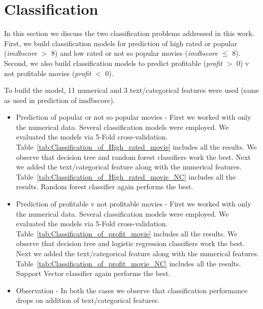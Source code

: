 \documentclass{article}%
\begin{document}
\section{Classification}

In this section we discuss the two classification problems addressed in this work. First, we build classification models for prediction of high rated or popular (\textit{imdbscore} $>$ 8) and low rated or not so popular movies (\textit{imdbscore} $\leq$ 8). Second, we also build classification models to predict profitable (\textit{profit} $>$ 0) v not profitable movies (\textit{profit} $<$ 0).

To build the model, 11 numerical and 3 text/categorical features were used (same as used in prediction of imdbscore). 

\begin{itemize}
\item Prediction of popular or not so popular movies - First we worked with only the numerical data. Several classification models were employed. We evaluated the models via 5-Fold cross-validation. Table~\ref{tab:Classification_of_High_rated_movie} includes all the results. We observe that decision tree and random forest classifiers work the best. Next we added the text/categorical feature along with the numerical features. Table~\ref{tab:Classification_of_High_rated_movie_NC} includes all the results. Random forest classifier again performs the best. 
\item Prediction of profitable v not profitable movies - First we worked with only the numerical data. Several classification models were employed. We evaluated the models via 5-Fold cross-validation. Table~\ref{tab:Classification_of_profit_movie} includes all the results. We observe that decision tree and logistic regression classifiers work the best. Next we added the text/categorical feature along with the numerical features. Table~\ref{tab:Classification_of_profit_movie_NC} includes all the results. Support Vector classifier again performs the best. 
\item Observation - In both the cases we observe that classification performance drops on addition of text/categorical features. 
\end{itemize}
\end{document}
